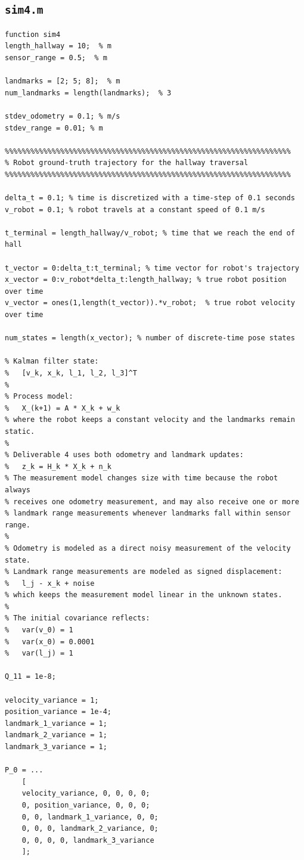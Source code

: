 \documentclass[11pt]{article}
\begin{document}
\subsection*{\texttt{sim4.m}}
\begin{lstlisting}[caption={sim4.m}, label={lst:sim4}]
function sim4
length_hallway = 10;  % m
sensor_range = 0.5;  % m

landmarks = [2; 5; 8];  % m
num_landmarks = length(landmarks);  % 3

stdev_odometry = 0.1; % m/s
stdev_range = 0.01; % m

%%%%%%%%%%%%%%%%%%%%%%%%%%%%%%%%%%%%%%%%%%%%%%%%%%%%%%%%%%%%%%%%%%%
% Robot ground-truth trajectory for the hallway traversal
%%%%%%%%%%%%%%%%%%%%%%%%%%%%%%%%%%%%%%%%%%%%%%%%%%%%%%%%%%%%%%%%%%%

delta_t = 0.1; % time is discretized with a time-step of 0.1 seconds
v_robot = 0.1; % robot travels at a constant speed of 0.1 m/s

t_terminal = length_hallway/v_robot; % time that we reach the end of hall

t_vector = 0:delta_t:t_terminal; % time vector for robot's trajectory
x_vector = 0:v_robot*delta_t:length_hallway; % true robot position over time
v_vector = ones(1,length(t_vector)).*v_robot;  % true robot velocity over time

num_states = length(x_vector); % number of discrete-time pose states

% Kalman filter state:
%   [v_k, x_k, l_1, l_2, l_3]^T
%
% Process model:
%   X_(k+1) = A * X_k + w_k
% where the robot keeps a constant velocity and the landmarks remain static.
%
% Deliverable 4 uses both odometry and landmark updates:
%   z_k = H_k * X_k + n_k
% The measurement model changes size with time because the robot always
% receives one odometry measurement, and may also receive one or more
% landmark range measurements whenever landmarks fall within sensor range.
%
% Odometry is modeled as a direct noisy measurement of the velocity state.
% Landmark range measurements are modeled as signed displacement:
%   l_j - x_k + noise
% which keeps the measurement model linear in the unknown states.
%
% The initial covariance reflects:
%   var(v_0) = 1
%   var(x_0) = 0.0001
%   var(l_j) = 1

Q_11 = 1e-8;

velocity_variance = 1;
position_variance = 1e-4;
landmark_1_variance = 1;
landmark_2_variance = 1;
landmark_3_variance = 1;

P_0 = ...
    [
    velocity_variance, 0, 0, 0, 0;
    0, position_variance, 0, 0, 0;
    0, 0, landmark_1_variance, 0, 0;
    0, 0, 0, landmark_2_variance, 0;
    0, 0, 0, 0, landmark_3_variance
    ];


\end{lstlisting}
\end{document}
